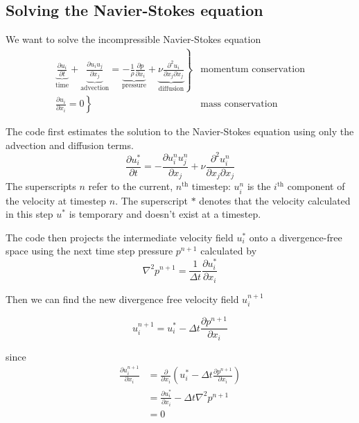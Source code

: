 \documentclass[12pt]{article}
\begin{document}
\subsection{Solving the Navier-Stokes equation}
\label{mathBasics}

We want to solve the incompressible Navier-Stokes equation
\begin{align*}
  \left. \underbrace{\frac{\partial u_i}{\partial t}}_\textrm{time} +  \underbrace{\frac{\partial u_i u_j}{\partial x_j}}_\textrm{advection} = \underbrace{- \frac{1}{\rho}\frac{\partial p}{\partial x_i}}_\textrm{pressure} + \underbrace{\nu \frac{\partial^2 u_i}{\partial x_j \partial x_j}}_\textrm{diffusion} \right\} &\textrm{momentum conservation} \\
\left. \frac{\partial u_i}{\partial x_i} = 0 \right\} &\textrm{mass conservation}
\end{align*}

The code first estimates the solution to the Navier-Stokes equation using only the advection and diffusion terms. 
\begin{equation}
 \frac{\partial u_i^*}{\partial t} =   -\frac{\partial u_i^n u_j^n}{\partial x_j} + \nu \frac{\partial^2 u_i^n}{\partial x_j \partial x_j} 
 \label{predict}
\end{equation}
The superscripts $n$ refer to the current, $n^\textrm{th}$ timestep: $u_i^n$ is the $i^\textrm{th}$ component of the velocity at timestep $n$.  The superscript $*$ denotes that the velocity calculated in this step $u^*$ is temporary and doesn't exist at a timestep.

The code then projects the intermediate velocity field $u_i^*$ onto a divergence-free space using the next time step pressure $p^{n+1}$ calculated by
\begin{equation}
\nabla^2 p^{n+1} = \frac{1}{\Delta t}\frac{\partial u_i^*}{\partial x_i}
\label{poisson}
\end{equation}

Then we can find the new divergence free velocity field $u_i^{n+1}$ 

\begin{equation}
u_i^{n+1}= u_i^* - \Delta t\frac{\partial p^{n+1}}{\partial x_i}
\label{correct}
\end{equation}

since
\begin{align*}
\frac{\partial  u_i^{n+1}}{\partial x_i} &= \frac{\partial}{\partial x_i}\left(u_i^* - \Delta t\frac{\partial p^{n+1}}{\partial x_i} \right) \\
&= \frac{\partial u_i^*}{\partial x_i} - \Delta t\nabla^2p^{n+1} \\
&= 0 \\
\end{align*}
\end{document}
